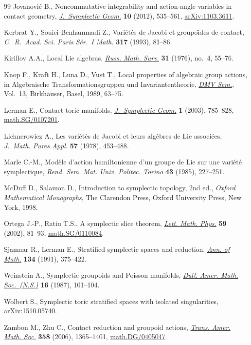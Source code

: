 \documentclass[10pt,a4paper]{amsart}
\numberwithin{equation}{section}
\begin{document}
\begin{thebibliography}{99}
Jovanovi\'c B., Noncommutative integrability and action-angle variables in
 contact geometry, \href{https://doi.org/10.4310/JSG.2012.v10.n4.a3}{\textit{J.~Symplectic Geom.}} \textbf{10} (2012), 535--561,
 \href{http://arxiv.org/abs/1103.3611}{arXiv:1103.3611}.

Kerbrat Y., Souici-Benhammadi Z., Vari\'et\'es de {J}acobi et groupo\"\i des de
 contact, \textit{C.~R.~Acad. Sci. Paris S\'er.~I Math.} \textbf{317} (1993),
 81--86.

Kirillov A.A., Local {L}ie algebras, \href{https://doi.org/10.1070/RM1976v031n04ABEH001556}{\textit{Russ. Math. Surv.}} \textbf{31}
 (1976), no.~4, 55--76.

Knop F., Kraft H., Luna D., Vust T., Local properties of algebraic group
 actions, in Algebraische {T}ransformationsgruppen und {I}nvariantentheorie,
 \href{https://doi.org/10.1007/978-3-0348-7662-9_4}{\textit{DMV Sem.}}, Vol.~13, Birkh\"auser, Basel, 1989, 63--75.

Lerman E., Contact toric manifolds, \href{https://doi.org/10.4310/JSG.2001.v1.n4.a6}{\textit{J.~Symplectic Geom.}} \textbf{1}
 (2003), 785--828, \href{http://arxiv.org/abs/math.SG/0107201}{math.SG/0107201}.

Lichnerowicz A., Les vari\'et\'es de {J}acobi et leurs alg\`ebres de {L}ie
 associ\'ees, \textit{J.~Math. Pures Appl.} \textbf{57} (1978), 453--488.

Marle C.-M., Mod\`ele d'action hamiltonienne d'un groupe de {L}ie sur une
 vari\'et\'e symplectique, \textit{Rend. Sem. Mat. Univ. Politec. Torino}
 \textbf{43} (1985), 227--251.

McDuf\/f D., Salamon D., Introduction to symplectic topology, 2nd ed., \textit{Oxford
 Mathematical Monographs}, The Clarendon Press, Oxford University Press, New
 York, 1998.

Ortega J.-P., Ratiu T.S., A symplectic slice theorem, \href{https://doi.org/10.1023/A:1014407427842}{\textit{Lett. Math. Phys.}}
 \textbf{59} (2002), 81--93, \href{http://arxiv.org/abs/math.SG/0110084}{math.SG/0110084}.

Sjamaar R., Lerman E., Stratif\/ied symplectic spaces and reduction, \href{https://doi.org/10.2307/2944350}{\textit{Ann.
 of Math.}} \textbf{134} (1991), 375--422.

Weinstein A., Symplectic groupoids and {P}oisson manifolds, \href{https://doi.org/10.1090/S0273-0979-1987-15473-5}{\textit{Bull. Amer.
 Math. Soc.~(N.S.)}} \textbf{16} (1987), 101--104.

Wolbert S., Symplectic toric stratif\/ied spaces with isolated singularities,
 \href{http://arxiv.org/abs/1510.05740}{arXiv:1510.05740}.

Zambon M., Zhu C., Contact reduction and groupoid actions, \href{https://doi.org/10.1090/S0002-9947-05-03832-8}{\textit{Trans. Amer.
 Math. Soc.}} \textbf{358} (2006), 1365--1401, \href{http://arxiv.org/abs/math.DG/0405047}{math.DG/0405047}.

\end{thebibliography}
\end{document}
